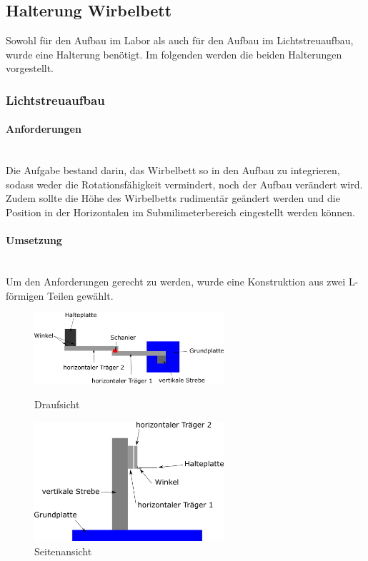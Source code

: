 \subsection{Halterung Wirbelbett}

Sowohl für den Aufbau im Labor als auch für den Aufbau im Lichtstreuaufbau, wurde eine Halterung benötigt. Im folgenden werden die beiden Halterungen vorgestellt.

\subsubsection{Lichtstreuaufbau}


\paragraph{Anforderungen}

\hfill \\
Die Aufgabe bestand darin, das Wirbelbett so in den Aufbau zu integrieren, sodass weder die Rotationsfähigkeit vermindert, noch der Aufbau verändert wird. Zudem sollte die Höhe des Wirbelbetts rudimentär geändert werden und die Position in der Horizontalen im Submilimeterbereich eingestellt werden können. 


\paragraph{Umsetzung}
\hfill \\
Um den Anforderungen gerecht zu werden, wurde eine Konstruktion aus zwei L-förmigen Teilen gewählt. 

\begin{figure}[h]
	\begin{minipage}[hbt]{7cm}
		\centering
		\includegraphics[width=7cm]{Halterung_Lichtstreu_Vogel.png}
		\caption{Draufsicht}
	\end{minipage}
	\hfill
	\begin{minipage}[hbt]{7cm}
		\centering
		\includegraphics[width=7cm]{Halterung_Lichtstreu_Seite.png}
		\caption{Seitenansicht}
	\end{minipage}
\end{figure}


